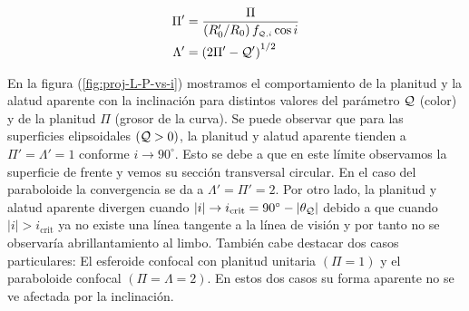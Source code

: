 \begin{align}
  \Pi' &= \frac{\Pi}{\left(R'_0/R_0\right)f_{\scriptscriptstyle \mathcal{Q}, i}\cos i}\\
  \Lambda' &= \left(2\Pi' - \mathcal{Q}'\right)^{1/2}
\end{align}

En la figura (\ref{fig:proj-L-P-vs-i}) mostramos el comportamiento de la planitud y la alatud aparente con la inclinación para distintos valores del parámetro $\mathcal{Q}$ (color) y de la planitud $\Pi$ (grosor de la curva). Se puede observar que para las superficies elipsoidales $(\mathcal{Q} > 0)$, la planitud y alatud aparente tienden a $\Pi' = \Lambda' = 1$ conforme $i \to 90^\circ$. Esto se debe a que en este límite observamos la superficie de frente y vemos su sección transversal circular. En el caso del paraboloide la convergencia se da a $\Lambda' = \Pi' = 2$. Por otro lado, la planitud y alatud aparente divergen cuando $|i| \to i_{\mathrm{crit}} = 90^\circ - |\theta_{\mathcal{Q}}|$ debido a que cuando $|i| > i_{\mathrm{crit}}$ ya no existe una línea tangente a la línea de visión y por tanto no se observaría abrillantamiento al limbo. También cabe destacar dos casos particulares: El esferoide confocal con planitud unitaria $(\Pi = 1)$ y el paraboloide confocal $(\Pi = \Lambda = 2)$. En estos dos casos su forma aparente no se ve afectada por la inclinación.

